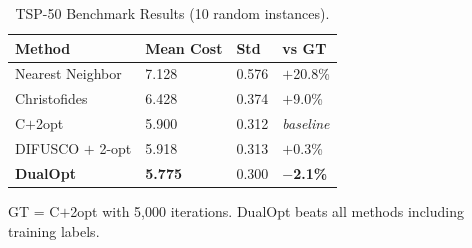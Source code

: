 \documentclass[10pt]{article}
\begin{document}
\thispagestyle{empty}

\begin{table}[h]
\centering
\caption{TSP-50 Benchmark Results (10 random instances).}
\label{tab:tsp50}
\small
\begin{tabular}{@{}llll@{}}
\toprule
\textbf{Method} & \textbf{Mean Cost} & \textbf{Std} & \textbf{vs GT} \\
\midrule
Nearest Neighbor  & 7.128 & 0.576 & $+$20.8\% \\
Christofides      & 6.428 & 0.374 & $+$9.0\% \\
C$+$2opt          & 5.900 & 0.312 & \textit{baseline} \\
\midrule
DIFUSCO $+$ 2-opt & 5.918 & 0.313 & $+$0.3\% \\
\textbf{DualOpt}  & \textbf{\textcolor{bestgreen}{5.775}} & 0.300 & \textbf{\textcolor{bestgreen}{$-$2.1\%}} \\
\bottomrule
\end{tabular}

\vspace{2pt}
{\footnotesize GT = C$+$2opt with 5,000 iterations. DualOpt beats all methods including training labels.}
\end{table}
\end{document}
